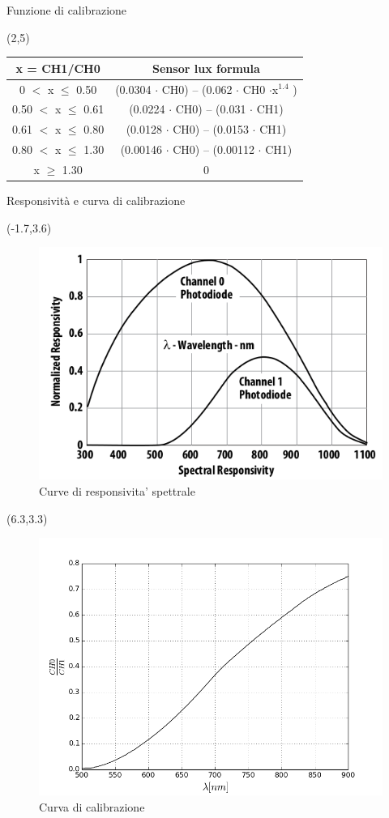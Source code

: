 \documentclass{beamer}
\begin{document}
\begin{frame}{Funzione di calibrazione}
\begin{textblock}{11.5}(2,5)
\begin{tabular}{c|c}
\textbf{x = CH1/CH0} & \textbf{Sensor lux formula} \\ 
\hline 
0 $<$ x $\leq$ 0.50  & (0.0304 $\cdot$ CH0) – (0.062 $\cdot$ CH0 $\cdot $x$^{1.4}$ ) \\ 
\hline 
0.50 $<$ x $\leq$ 0.61 & (0.0224 $\cdot$ CH0) – (0.031 $\cdot$ CH1) \\ 
\hline 
0.61 $<$ x $\leq$ 0.80 & (0.0128 $\cdot$ CH0) – (0.0153 $\cdot$ CH1) \\ 
\hline 
0.80 $<$ x $\leq$ 1.30 & (0.00146 $\cdot$ CH0) – (0.00112 $\cdot$ CH1) \\ 
\hline 
x $\geq$ 1.30 & 0 \\ 
\end{tabular} 
\end{textblock}
\end{frame}

\begin{frame}{Responsività e curva di calibrazione}
\begin{textblock}{12}(-1.7,3.6)
\begin{figure}
\centering
\includegraphics[width=0.6\linewidth]{./responsivity}
\caption{Curve di responsivita' spettrale}
\label{fig:resp}
\end{figure}
\end{textblock}


\begin{textblock}{11.5}(6.3,3.3)
\begin{figure}
\centering
\includegraphics[width=0.6\linewidth]{./rapporto}
\caption{Curva di calibrazione}
\label{fig:cal}
\end{figure}
\end{textblock}
\end{frame}
\end{document}
